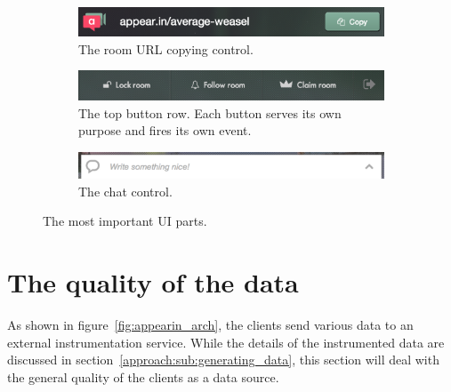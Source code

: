     \begin{figure}[t]
      \centering
      \begin{subfigure}[t]{0.8\textwidth}
        \includegraphics[width=\textwidth]{Figures/screenshots/appearin/feature-copy}
        \caption{The room URL copying control.}
        \label{fig:ui:copy_control}
      \end{subfigure}

      \vspace{.5cm}

      \begin{subfigure}[t]{0.95\textwidth}
        \includegraphics[width=\textwidth]{Figures/screenshots/appearin/feature-buttons-top}
        \caption{The top button row. Each button serves its own purpose and fires its own event.}
        \label{fig:ui:top_buttons}
      \end{subfigure}

      \vspace{.5cm}

      \begin{subfigure}[t]{0.95\textwidth}
        \includegraphics[width=\textwidth]{Figures/screenshots/appearin/feature-chat}
        \caption{The chat control.}
        \label{fig:ui:chat}
      \end{subfigure}

      \caption{The most important UI parts.}
      \label{fig:important_ui_parts}
    \end{figure}


\section{The quality of the data}
\label{survey:data_quality}

  As shown in figure~\ref{fig:appearin_arch}, the clients send various data to an external instrumentation service. While the details of the instrumented data are discussed in section~\ref{approach:sub:generating_data}, this section will deal with the general quality of the clients as a data source.

